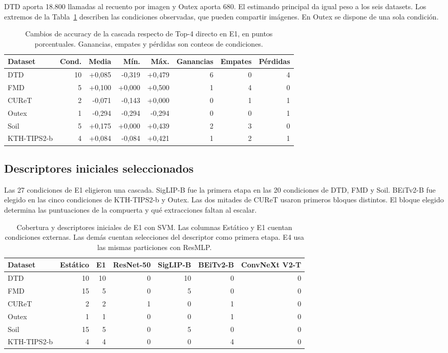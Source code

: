 \documentclass[a4paper,fleqn]{cas-sc}
\begin{document}
DTD aporta 18.800 llamadas al recuento por imagen y Outex aporta 680. El estimando principal da igual peso a los seis datasets. Los extremos de la Tabla~\ref{tab:e1-ranges} describen las condiciones observadas, que pueden compartir imágenes. En Outex se dispone de una sola condición.

\begin{table}[pos=htbp]
\centering
\caption{Cambios de accuracy de la cascada respecto de Top-4 directo en E1, en puntos porcentuales. Ganancias, empates y pérdidas son conteos de condiciones.}
\label{tab:e1-ranges}
\begin{tabular}{@{}lrrrrrrr@{}}
\toprule
Dataset & Cond. & Media & Mín. & Máx. & Ganancias & Empates & Pérdidas \\
\midrule
DTD & 10 & +0,085 & -0,319 & +0,479 & 6 & 0 & 4 \\
FMD & 5 & +0,100 & +0,000 & +0,500 & 1 & 4 & 0 \\
CUReT & 2 & -0,071 & -0,143 & +0,000 & 0 & 1 & 1 \\
Outex & 1 & -0,294 & -0,294 & -0,294 & 0 & 0 & 1 \\
Soil & 5 & +0,175 & +0,000 & +0,439 & 2 & 3 & 0 \\
KTH-TIPS2-b & 4 & +0,084 & -0,084 & +0,421 & 1 & 2 & 1 \\
\bottomrule
\end{tabular}
\end{table}

\subsection{Descriptores iniciales seleccionados}

Las 27 condiciones de E1 eligieron una cascada. SigLIP-B fue la primera etapa en las 20 condiciones de DTD, FMD y Soil. BEiTv2-B fue elegido en las cinco condiciones de KTH-TIPS2-b y Outex. Las dos mitades de CUReT usaron primeros bloques distintos. El bloque elegido determina las puntuaciones de la compuerta y qué extracciones faltan al escalar.

\begin{table}[pos=htbp]
\centering
\caption{Cobertura y descriptores iniciales de E1 con SVM. Las columnas Estático y E1 cuentan condiciones externas. Las demás cuentan selecciones del descriptor como primera etapa. E4 usa las mismas particiones con ResMLP.}
\label{tab:e1-routes}
\begin{tabular}{@{}lrrrrrr@{}}
\toprule
Dataset & Estático & E1 & ResNet-50 & SigLIP-B & BEiTv2-B & ConvNeXt V2-T \\
\midrule
DTD & 10 & 10 & 0 & 10 & 0 & 0 \\
FMD & 15 & 5 & 0 & 5 & 0 & 0 \\
CUReT & 2 & 2 & 1 & 0 & 1 & 0 \\
Outex & 1 & 1 & 0 & 0 & 1 & 0 \\
Soil & 15 & 5 & 0 & 5 & 0 & 0 \\
KTH-TIPS2-b & 4 & 4 & 0 & 0 & 4 & 0 \\
\bottomrule
\end{tabular}
\end{table}
\end{document}
